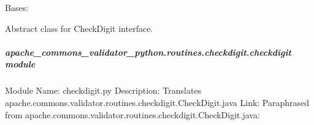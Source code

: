 \documentclass[letterpaper,10pt,english]{sphinxmanual}
\begin{document}
\begin{fulllineitems}
\label{\detokenize{apache_commons_validator_python.routines.checkdigit:apache_commons_validator_python.routines.checkdigit.abstract_checkdigit.AbstractCheckDigit}}
\pysigstartsignatures
{}
\pysigstopsignatures
\sphinxAtStartPar
Bases: 

\sphinxAtStartPar
Abstract class for CheckDigit interface.

\end{fulllineitems}



\subparagraph{apache\_commons\_validator\_python.routines.checkdigit.checkdigit module}
\label{\detokenize{apache_commons_validator_python.routines.checkdigit:module-apache_commons_validator_python.routines.checkdigit.checkdigit}}\label{\detokenize{apache_commons_validator_python.routines.checkdigit:apache-commons-validator-python-routines-checkdigit-checkdigit-module}}
\sphinxAtStartPar
Module Name: checkdigit.py
Description: Translates apache.commons.validator.routines.checkdigit.CheckDigit.java
Link: 
Paraphrased from apache.commons.validator.routines.checkdigit.CheckDigit.java:
\end{document}
